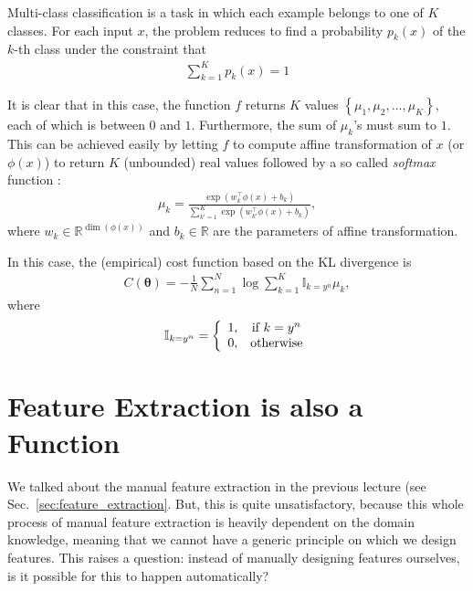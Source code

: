 \documentclass{report}
\newcommand{\vects}[1]{\boldsymbol{#1}}
\newcommand{\TT}[0]{\vects{\theta}}
\newcommand{\RR}[0]{\mathbb{R}}
\newcommand{\II}[0]{\mathbb{I}}
\begin{document}
Multi-class classification is a task in which each example belongs to one of $K$
classes. For each input $x$, the problem reduces to find a probability $p_k(x)$
of the $k$-th class under the constraint that 
\begin{align*}
    \sum_{k=1}^K p_k(x)=1
\end{align*}

It is clear that in this case, the function $f$ returns $K$ values $\left\{
\mu_1, \mu_2, \ldots, \mu_K \right\}$, each of which is between $0$ and $1$.
Furthermore, the sum of $\mu_k$'s must sum to $1$. This can be achieved easily
by letting $f$ to compute affine transformation of $x$ (or $\phi(x)$) to return
$K$ (unbounded) real values followed by a so called {\em softmax}
function \citep{Bridle1990}:
\begin{align}
    \label{eq:softmax}
    \mu_k = \frac{\exp(w_k^\top \phi(x) + b_k)}{\sum_{k'=1}^K \exp(w_{k'}^\top
    \phi(x) + b_k)},
\end{align}
where $w_k \in \RR^{\dim(\phi(x))}$ and $b_k \in \RR$ are the parameters of
affine transformation.

In this case, the (empirical) cost function based on the KL divergence is
\begin{align}
    \label{eq:cat_crossentropy}
    C(\TT) = -\frac{1}{N} \sum_{n=1}^N \log \sum_{k=1}^K \II_{k=y^n} \mu_k,
\end{align}
where 
\begin{align}
    \label{eq:indicator_function}
    \II_{k=y^n} = \left\{ 
        \begin{array}{c c}
            1, & \text{if }k=y^n \\
            0, & \text{otherwise}
        \end{array}
        \right.
\end{align}

\section{Feature Extraction is also a Function}
\label{sec:feature_ext}

We talked about the manual feature extraction in the previous lecture (see
Sec.~\ref{sec:feature_extraction}. But, this is quite unsatisfactory, because
this whole process of manual feature extraction is heavily dependent on the
domain knowledge, meaning that we cannot have a generic principle on which we
design features. This raises a question: instead of manually designing features
ourselves, is it possible for this to happen automatically?
\end{document}
